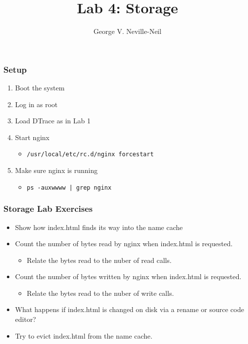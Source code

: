 \documentclass[pdftex]{beamer}
\begin{document}

\title{Lab 4: Storage}
\author[shortname]{George V. Neville-Neil}

\begin{frame}[fragile]
  \frametitle{Setup}
  \begin{enumerate}
  \item Boot the system
  \item Log in as root
  \item Load DTrace as in Lab 1
  \item Start nginx
    \begin{itemize}
    \item \verb|/usr/local/etc/rc.d/nginx forcestart|
    \end{itemize}
  \item Make sure nginx is running
    \begin{itemize}
    \item \verb+ps -auxwwww | grep nginx+
    \end{itemize}
  \end{enumerate}
\end{frame}


\begin{frame}[fragile]
  \frametitle{Storage Lab Exercises}
  \begin{itemize}
  \item Show how index.html finds its way into the name cache
  \item Count the number of bytes read by nginx when index.html is requested.
    \begin{itemize}
    \item Relate the bytes read to the nuber of read calls.
    \end{itemize}
  \item Count the number of bytes written by nginx when index.html is requested.
    \begin{itemize}
    \item Relate the bytes read to the nuber of write calls.
    \end{itemize}
  \item What happens if index.html is changed on disk via a rename or
    source code editor?
  \item Try to evict index.html from the name cache.
  \end{itemize}
\end{frame}
\end{document}
